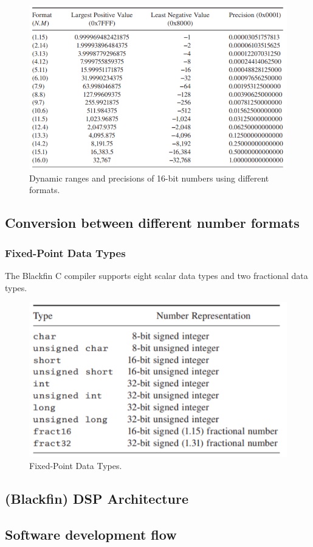 \begin{figure} [H]
 	\centering
 	\includegraphics[width=\linewidth]{graphics/2.png}
 	\caption{Dynamic ranges and precisions of 16-bit numbers using different formats.}
 	\label{fig:2}
 \end{figure}



\subsection{Conversion between different number formats}
\subsubsection{Fixed-Point Data Types}
The Blackfin C compiler supports eight scalar data types and two fractional data types.

 \begin{figure} [H]
	\centering
	\includegraphics[width=0.85\linewidth]{graphics/3.png}
	\caption{Fixed-Point Data Types.}
	\label{fig:3}
\end{figure}

\subsection{(Blackfin) DSP Architecture}

\subsection{Software development flow}
